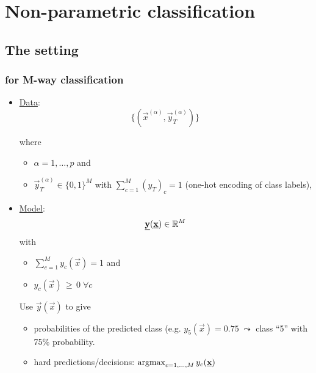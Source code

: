 \section{Non-parametric classification}

\subsection{The setting}

\begin{frame}\frametitle{\subsecname for M-way classification}


\begin{itemize}
	\item \underline{Data}:\\

	\begin{equation*}
	\Big\{ \left(\vec x^{(\alpha)}, \vec y^{(\alpha)}_{T} \right) \Big\}\,
	\end{equation*}

	where 
	\begin{itemize}
	\item[] $\alpha = 1,\ldots,p$ and
	\item[]$\vec y_T^{(\alpha)} \in \{0, 1\}^M$ with $\sum_{c=1}^{M} (y_{T})_c = 1$ (one-hot encoding of class labels),
	\end{itemize}

	\pause

	\item \underline{Model}:\\

	\begin{equation*}
	\underline{\mathbf{y}}(\underline{\mathbf{x}}) \in \mathbb{R}^M 
	\end{equation*}
	with 
	\begin{itemize}
	\item[] $\sum_{c=1}^{M} y_c(\vec x) = 1$ and
	\item[] $y_c(\vec x)\,\ge\,0\; \forall c$
	\end{itemize}
	
	Use $\vec y(\vec x)$ to give
	\begin{itemize}
	\item probabilities of the predicted class (e.g. $y_5(\vec x) = 0.75\; \leadsto$ class ``5'' with 75\% probability.
	\item hard predictions/decisions: $\argmax_{c=1,\ldots,M} y_c(\vec x)$
	\end{itemize}

\end{itemize}

\end{frame}

